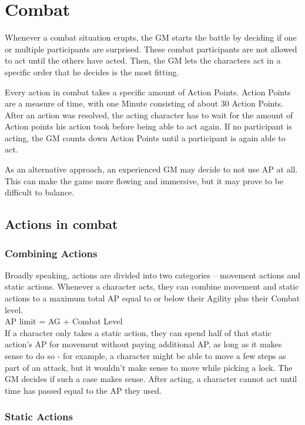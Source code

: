 
\chapter{Combat}
Whenever a combat situation erupts, the GM starts the battle by deciding if one or multiple participants are surprised.
These combat participants are not allowed to act until the others have acted.
Then, the GM lets the characters act in a specific order that he decides is the most fitting.

Every action in combat takes a specific amount of Action Points.
Action Points are a measure of time, with one Minute consisting of about 30 Action Points.
After an action was resolved, the acting character has to wait for the amount of Action points his action took before being able to act again.
If no participant is acting, the GM counts down Action Points until a participant is again able to act.

As an alternative approach, an experienced GM may decide to not use AP at all.
This can make the game more flowing and immersive, but it may prove to be difficult to balance.


\section{Actions in combat}

\subsection{Combining Actions}
Broadly speaking, actions are divided into two categories -- movement actions and static actions.
Whenever a character acts, they can combine movement and static actions to a maximum total AP equal to or below their Agility plus their Combat level.\\
AP limit = AG + Combat Level\\
If a character only takes a static action, they can spend half of that static action's AP for movement without paying additional AP, as long as it makes sense to do so - for example, a character might be able to move a few steps as part of an attack, but it wouldn't make sense to move while picking a lock.
The GM decides if such a case makes sense.
After acting, a character cannot act until time has passed equal to the AP they used.

\subsection{Static Actions}

